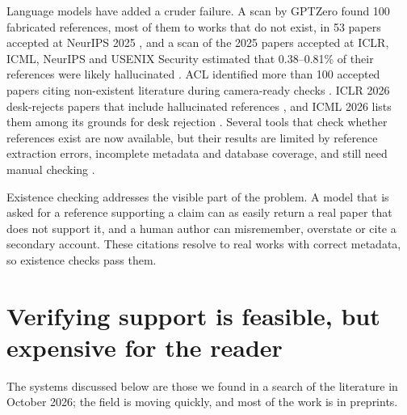 \documentclass[11pt]{article}
\begin{document}
Language models have added a cruder failure. A scan by GPTZero found 100 fabricated references, most of them to works that do not exist, in 53 papers accepted at NeurIPS 2025 \citep{ansari2026compound}, and a scan of the 2025 papers accepted at ICLR, ICML, NeurIPS and USENIX Security estimated that 0.38--0.81\% of their references were likely hallucinated \citep{russinovich2026phantom}. ACL identified more than 100 accepted papers citing non-existent literature during camera-ready checks \citep{acl2026statement}. ICLR 2026 desk-rejects papers that include hallucinated references \citep{iclr2026response}, and ICML 2026 lists them among its grounds for desk rejection \citep{icml2026ethics}. Several tools that check whether references exist are now available, but their results are limited by reference extraction errors, incomplete metadata and database coverage, and still need manual checking \citep{badalova2026hallucinated}.

Existence checking addresses the visible part of the problem. A model that is asked for a reference supporting a claim can as easily return a real paper that does not support it, and a human author can misremember, overstate or cite a secondary account. These citations resolve to real works with correct metadata, so existence checks pass them.

\section{Verifying support is feasible, but expensive for the reader}

The systems discussed below are those we found in a search of the literature in October 2026; the field is moving quickly, and most of the work is in preprints.
\end{document}
